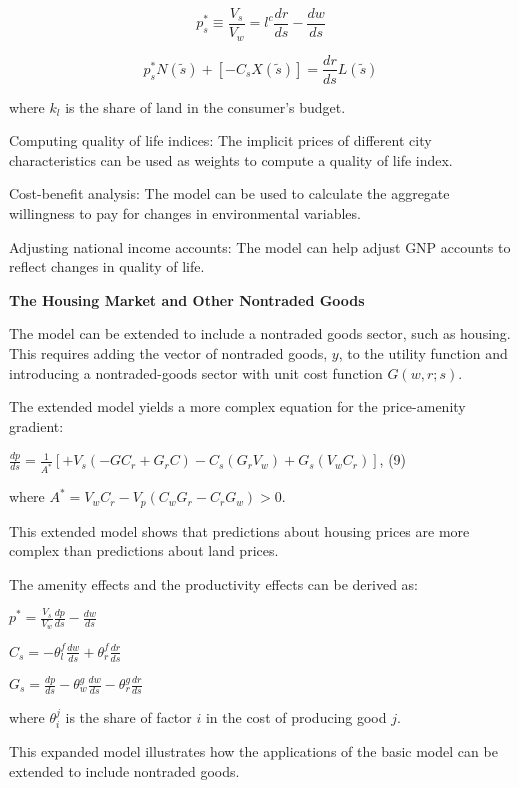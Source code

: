 \documentclass{article}
\numberwithin{equation}{section} %
\begin{document}
\begin{equation}
  p^*_s \equiv \frac{V_s}{V_w}=l^c \frac{dr}{ds}-\frac{dw}{ds}
\end{equation}

\begin{equation}
  p^*_sN(\tilde s)+[-C_s X(\tilde s)]=\frac{dr}{ds}L(\tilde s)
\end{equation}

where $k_l$ is the share of land in the consumer's budget.

Computing quality of life indices: The implicit prices of different city characteristics can be used as weights to compute a quality of life index.

Cost-benefit analysis: The model can be used to calculate the aggregate willingness to pay for changes in environmental variables.

Adjusting national income accounts: The model can help adjust GNP accounts to reflect changes in quality of life.

\textbf{The Housing Market and Other Nontraded Goods}

The model can be extended to include a nontraded goods sector, such as housing. This requires adding the vector of nontraded goods, $y$, to the utility function and introducing a nontraded-goods sector with unit cost function $G(w, r; s)$.

The extended model yields a more complex equation for the price-amenity gradient:

$\frac{dp}{ds} = \frac{1}{A^*}[+V_s(-GC_r + G_rC) - C_s(G_rV_w) + G_s(V_wC_r)]$, (9)

where $A^* = V_wC_r - V_p(C_wG_r - C_rG_w) > 0$.

This extended model shows that predictions about housing prices are more complex than predictions about land prices.

The amenity effects and the productivity effects can be derived as:

$p^* = \frac{V_s}{V_w}\frac{dp}{ds} - \frac{dw}{ds}$

$C_s = -\theta_l^f\frac{dw}{ds} + \theta_r^f\frac{dr}{ds}$

$G_s = \frac{dp}{ds} - \theta_w^g\frac{dw}{ds} - \theta_r^g\frac{dr}{ds}$

where $\theta_i^j$ is the share of factor $i$ in the cost of producing good $j$.

This expanded model illustrates how the applications of the basic model can be extended to include nontraded goods.
\end{document}
